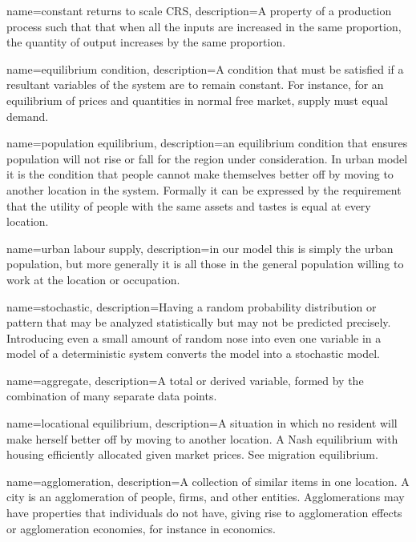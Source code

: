 {
name=constant returns to scale \gls{CRS},
description={A property of a production process such that that when all
the \glspl{input} are increased in the same proportion, the quantity of \gls{output} increases by the same proportion.}
}

{
name=equilibrium condition,
description={A condition that must be satisfied if a resultant variables of the system are to remain constant. For instance, for an equilibrium of prices and quantities in normal free \gls{market}, supply must equal demand.} %
}

{
name=population equilibrium,
description={an \gls{equilibrium condition} that ensures population will not rise or fall  for the region under consideration. In urban model it is the condition that people cannot make themselves better off by moving to another location in the system. Formally it can be expressed by the requirement that the utility of people with the same  assets and tastes is equal at every location. }
}

{
name=urban labour supply,
description={in our model this is simply the urban population, but more generally it is all those in the general population willing to work at the location or occupation.}
}

{
name=stochastic,
description={Having a random probability distribution or pattern that may be analyzed statistically but may not be predicted precisely. Introducing even a small amount of random nose into even one variable in a model of a deterministic system converts the model into a stochastic model.}
}

{
name=aggregate,
description={A total or derived variable, formed by the combination of many separate data points.}
}

{
name=locational equilibrium,
description={A situation in which no resident will make herself better off by moving to another location. A Nash equilibrium with housing efficiently allocated  given market prices. See \gls{migration equilibrium}.}
}

{
name=agglomeration,
description={A collection of similar items in one location. A city is an agglomeration of people, firms, and other entities. Agglomerations may have properties that individuals do not have, giving rise to \glspl{agglomeration effect} or \gls{agglomeration economies}, for instance in economics.}
}

